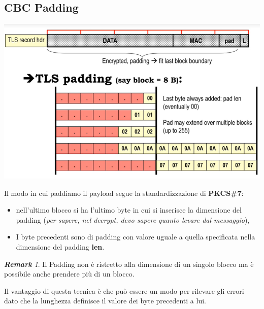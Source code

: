\documentclass{book}
\theoremstyle{remark}
\newtheorem*{remark}{\textbf{Remark}}
\begin{document}
\subsection{CBC Padding}
\begin{center}
	\includegraphics[scale=0.4]{CBCPADDING.png}
\end{center}
Il modo in cui paddiamo il payload segue la standardizzazione di \textbf{ PKCS\#7}:
\begin{itemize}
	\item nell'ultimo blocco si ha l'ultimo byte in cui si inserisce la dimensione del padding (\emph{per sapere, nel decrypt, devo sapere quanto levare dal messaggio}),
	\item I byte precedenti sono di padding con valore uguale a quella specificata nella dimensione del padding \textbf{len}\@.
\end{itemize}
\begin{remark}
	Il Padding non è ristretto alla dimensione di un singolo blocco ma è possibile anche prendere più di un blocco\@.
\end{remark}
Il vantaggio di questa tecnica è che può essere un modo per rilevare gli errori dato che la lunghezza definisce il valore dei byte precedenti a lui\@.
\end{document}
